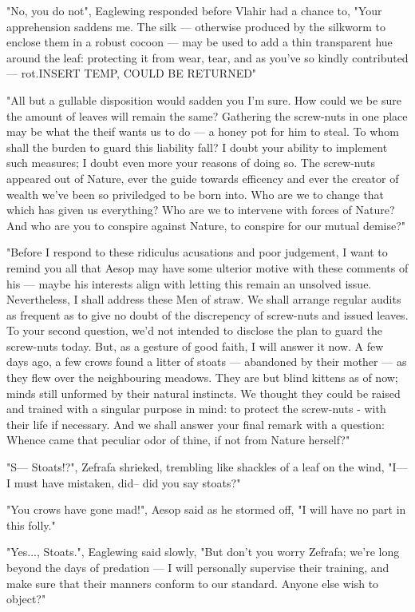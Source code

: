 "No, you do not", Eaglewing responded before Vlahir had a chance to, "Your apprehension saddens me. The silk — otherwise produced by the silkworm to enclose them in a robust cocoon — may be used to add a thin transparent hue around the leaf: protecting it from wear, tear, and as you've so kindly contributed — rot.INSERT TEMP, COULD BE RETURNED"

"All but a gullable disposition would sadden you I'm sure. How could we be sure the amount of leaves will remain the same? Gathering the screw-nuts in one place may be what the theif wants us to do — a honey pot for him to steal. To whom shall the burden to guard this liability fall? I doubt your ability to implement such measures; I doubt even more your reasons of doing so. The screw-nuts appeared out of Nature, ever the guide towards efficency and ever the creator of wealth we've been so priviledged to be born into. Who are we to change that which has given us everything? Who are we to intervene with forces of Nature? And who are you to conspire against Nature, to conspire for our mutual demise?"

"Before I respond to these ridiculus acusations and poor judgement, I want to remind you all that Aesop may have some ulterior motive with these comments of his — maybe his interests align with letting this remain an unsolved issue.
Nevertheless, I shall address these Men of straw.
We shall arrange regular audits as frequent as to give no doubt of the discrepency of screw-nuts and issued leaves.
To your second question, we'd not intended to disclose the plan to guard the screw-nuts today. But, as a gesture of good faith, I will answer it now. A few days ago, a few crows found a litter of stoats — abandoned by their mother — as they flew over the neighbouring meadows. They are but blind kittens as of now; minds still unformed by their natural instincts. We thought they could be raised and trained with a singular purpose in mind: to protect the screw-nuts - with their life if necessary.
And we shall answer your final remark with a question: Whence came that peculiar odor of thine, if not from Nature herself?"

"S— Stoats!?", Zefrafa shrieked, trembling like shackles of a leaf on the wind, "I— I must have mistaken, did– did you say stoats?"

"You crows have gone mad!", Aesop said as he stormed off, "I will have no part in this folly."

"Yes..., Stoats.", Eaglewing said slowly, "But don't you worry Zefrafa; we're long beyond the days of predation — I will personally supervise their training, and make sure that their manners conform to our standard. Anyone else wish to object?"



